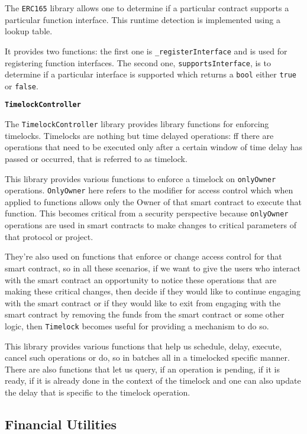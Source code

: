 The \texttt{ERC165} library allows one to determine if a particular
contract supports a particular function interface. This runtime
detection is implemented using a lookup table.

It provides two functions: the first one is \texttt{\_registerInterface}
and is used for registering function interfaces. The second one,
\texttt{supportsInterface}, is to determine if a particular interface is
supported which returns a \texttt{bool} either \texttt{true} or
\texttt{false}.

\textbf{\texttt{TimelockController}}

The \texttt{TimelockController} library provides library functions for
enforcing timelocks. Timelocks are nothing but time delayed operations:
ff there are operations that need to be executed only after a certain
window of time delay has passed or occurred, that is referred to as
timelock.

This library provides various functions to enforce a timelock on
\texttt{onlyOwner} operations. \texttt{OnlyOwner} here refers to the
modifier for access control which when applied to functions allows only
the Owner of that smart contract to execute that function. This becomes
critical from a security perspective because \texttt{onlyOwner}
operations are used in smart contracts to make changes to critical
parameters of that protocol or project.

They're also used on functions that enforce or change access control for
that smart contract, so in all these scenarios, if we want to give the
users who interact with the smart contract an opportunity to notice
these operations that are making these critical changes, then decide if
they would like to continue engaging with the smart contract or if they
would like to exit from engaging with the smart contract by removing the
funds from the smart contract or some other logic, then
\texttt{Timelock} becomes useful for providing a mechanism to do so.

This library provides various functions that help us schedule, delay,
execute, cancel such operations or do, so in batches all in a timelocked
specific manner. There are also functions that let us query, if an
operation is pending, if it is ready, if it is already done in the
context of the timelock and one can also update the delay that is
specific to the timelock operation.

\subsection{Financial Utilities}\label{financial-utilities}

